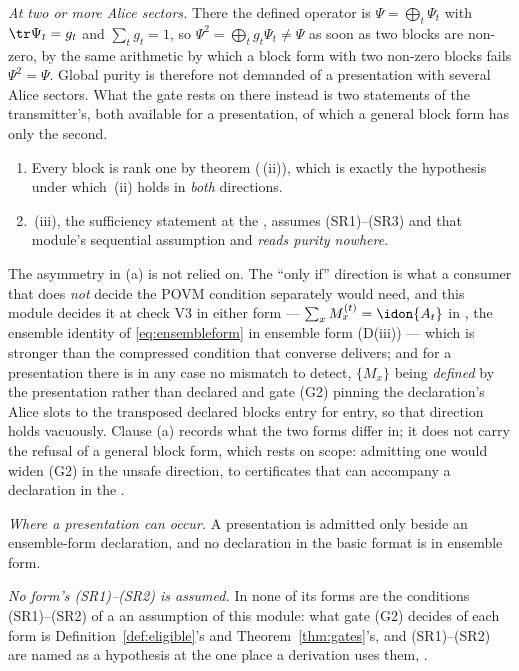 \begin{remark}
\emph{At two or more Alice sectors.} There the defined operator is
$\Psi=\bigoplus_t\Psi_t$ with $\tr\Psi_t=g_t$ and $\sum_tg_t=1$, so
$\Psi^2=\bigoplus_tg_t\Psi_t\ne\Psi$ as soon as two blocks are non-zero, by
the same arithmetic by which a block form with two non-zero blocks fails
$\Psi^2=\Psi$. Global purity is therefore not
demanded of a presentation with several Alice sectors. What the gate rests on
there instead is two statements of the transmitter's, both available for a
presentation, of which a general block form has only the second.
\begin{enumerate}[label=(\alph*),leftmargin=2.2em]
\item Every block is rank one by theorem
  (\,(ii)), which is exactly the
  hypothesis under which \,(ii)
  holds in \emph{both} directions.
\item {}\,(iii), the sufficiency
  statement at the , assumes (SR1)--(SR3) and that
  module's sequential assumption and \emph{reads purity nowhere}.
\end{enumerate}
The asymmetry in (a) is not relied on. The ``only if'' direction is what a
consumer that does \emph{not} decide the POVM condition separately would need,
and this module decides it at check V3 in either form ---
$\sum_xM^{(t)}_x=\idon{A_t}$ in , the ensemble identity of
\eqref{eq:ensembleform} in ensemble form (D(iii)) --- which is stronger than
the compressed condition that converse delivers; and for a presentation there
is in any case no mismatch to detect, $\{M_x\}$ being \emph{defined} by the
presentation rather than declared and gate (G2) pinning the declaration's
Alice slots to the transposed declared blocks entry for entry, so that
direction holds vacuously. Clause (a) records what the two forms differ in;
it does not carry the refusal of a general block form, which rests on scope:
admitting one would widen (G2) in the unsafe direction, to certificates that
can accompany a declaration in the .

\emph{Where a presentation can occur.} A presentation is admitted only beside
an ensemble-form declaration, and no declaration in the basic format is in
ensemble form.

\emph{No form's (SR1)--(SR2) is assumed.} In none of its forms are the
conditions (SR1)--(SR2) of a  an
assumption of this module: what gate (G2) decides of each form is
Definition~\ref{def:eligible}'s and Theorem~\ref{thm:gates}'s, and
(SR1)--(SR2) are named as a hypothesis at the one place a derivation uses
them, .
\end{remark}
